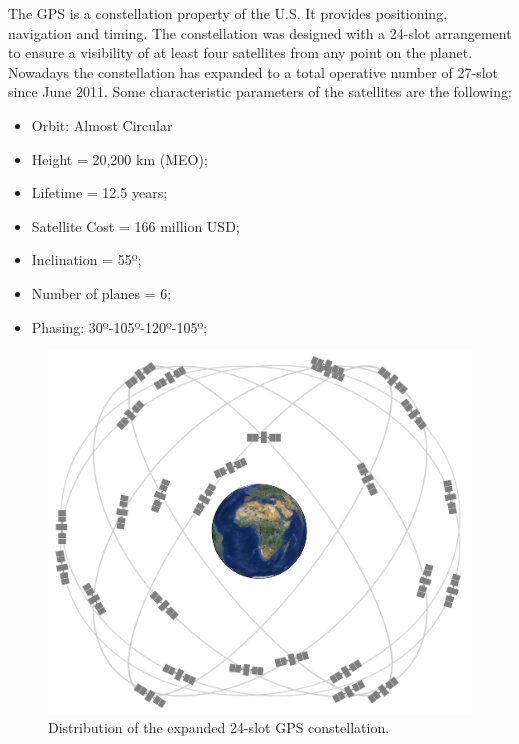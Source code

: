 The GPS is a constellation property of the U.S. It provides positioning, navigation and timing. The constellation was designed with a 24-slot arrangement to ensure a visibility of at least four satellites from any point on the planet. Nowadays the constellation has expanded to a total operative number of 27-slot since June 2011. Some characteristic parameters of the satellites are the following:

\begin{itemize}
\item Orbit: Almost Circular
\item Height = 20,200 km (MEO);
\item Lifetime = 12.5 years;
\item Satellite Cost = 166 million USD;
\item Inclination = 55º;
\item Number of planes = 6;
\item Phasing: 30º-105º-120º-105º;
\end{itemize}

\begin{figure}[H]
\begin{center}
\includegraphics[scale=0.16]{GPSconstellation.jpg}
\caption{Distribution of the expanded 24-slot GPS constellation.\cite{GPS}}
\end{center}
\end{figure}